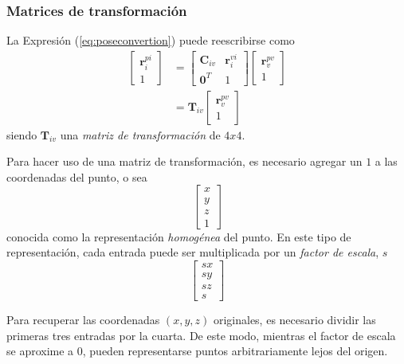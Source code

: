 \subsubsection{Matrices de transformación}
La Expresión (\ref{eq:poseconvertion}) puede reescribirse como
\begin{align}
    \begin{bmatrix}
        \bm{r}_i^{pi} \\
        1
    \end{bmatrix}
    &=
    \begin{bmatrix}
        \bm{C}_{iv} & \bm{r}_i^{vi} \\
        \bm{0}^T & 1
    \end{bmatrix}
    \begin{bmatrix}
        \bm{r}_v^{pv} \\
        1
    \end{bmatrix} \\
    &=
    \bm{T}_{iv}
    \begin{bmatrix}
        \bm{r}_v^{pv} \\
        1
    \end{bmatrix}
\end{align}
siendo $\bm{T}_{iv}$ una \textit{matriz de transformación} de $4x4$.

Para hacer uso de una matriz de transformación, es necesario agregar un $1$ a las coordenadas del punto, o sea
\begin{equation}
    \begin{bmatrix}
        x \\
        y \\
        z \\
        1
    \end{bmatrix}
\end{equation}
conocida como la representación \textit{homogénea} del punto. En este tipo de representación, cada entrada puede ser multiplicada por un \textit{factor de escala}, $s$
\begin{equation}
    \begin{bmatrix}
        sx  \\
        sy  \\
        sz  \\
        s
    \end{bmatrix}
\end{equation}

Para recuperar las coordenadas $(x,y,z)$ originales, es necesario dividir las primeras tres entradas por la cuarta. De este modo, mientras el factor de escala se aproxime a $0$, pueden representarse puntos arbitrariamente lejos del origen.


